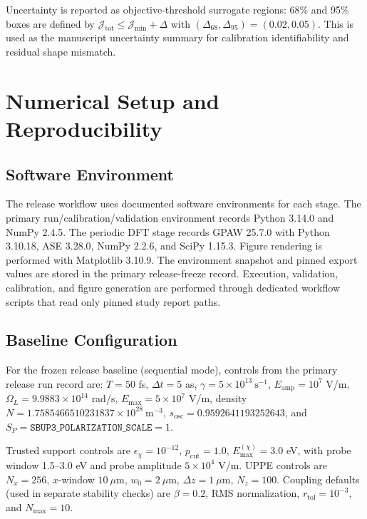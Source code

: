 \documentclass[aps,pra,twocolumn,reprint,superscriptaddress,nofootinbib]{revtex4-2}
\begin{document}
Uncertainty is reported as objective-threshold surrogate regions:
68\% and 95\% boxes are defined by
$\mathcal{J}_{\mathrm{tot}}\le \mathcal{J}_{\min}+\Delta$ with
$(\Delta_{68},\Delta_{95})=(0.02,0.05)$. This is used as the manuscript
uncertainty summary for calibration identifiability and residual shape mismatch.

\section{Numerical Setup and Reproducibility}
\subsection{Software Environment}
The release workflow uses documented software environments for each stage. The
primary run/calibration/validation environment records Python 3.14.0 and NumPy
2.4.5. The periodic DFT stage records GPAW 25.7.0 with Python 3.10.18, ASE
3.28.0, NumPy 2.2.6, and SciPy 1.15.3. Figure rendering is performed with
Matplotlib 3.10.9. The environment snapshot and pinned export values are stored
in the primary release-freeze record. Execution, validation, calibration, and
figure generation are performed through dedicated workflow scripts that read
only pinned study report paths.

\subsection{Baseline Configuration}
For the frozen release baseline (sequential mode), controls from
the primary release run record are:
$T=50$ fs, $\Delta t=5$ as, $\gamma=5\times10^{13}~\mathrm{s^{-1}}$,
$E_{\mathrm{amp}}=10^7$ V/m, $\Omega_L=9.9883\times10^{14}$ rad/s,
$E_{\max}=5\times10^7$ V/m, density
$N=1.7585466510231837\times10^{28}~\mathrm{m^{-3}}$,
$s_{\mathrm{osc}}=0.9592641193252643$, and
$S_P=\texttt{SBUP3\_POLARIZATION\_SCALE}=1$.

Trusted support controls are
$\epsilon_{\chi}=10^{-12}$, $p_{\mathrm{cut}}=1.0$,
$E_{\max}^{(\chi)}=3.0$ eV, with probe window
1.5--3.0 eV and probe amplitude $5\times10^4$ V/m.
UPPE controls are $N_x=256$, $x$-window $10~\mu$m, $w_0=2~\mu$m,
$\Delta z=1~\mu$m, $N_z=100$.
Coupling defaults (used in separate stability checks) are
$\beta=0.2$, RMS normalization, $r_{\mathrm{tol}}=10^{-3}$, and
$N_{\max}=10$.
\end{document}
